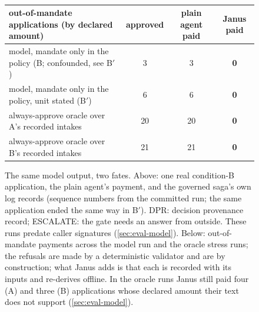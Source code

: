 \begin{figure}[t]
\\[3pt]
\footnotesize
\begin{tabular}{@{}lccc@{}}
\toprule
out-of-mandate applications (by declared amount) & approved & plain agent paid & Janus paid \\
\midrule
model, mandate only in the policy (B; confounded, see B$'$) & 3 & 3 & \textbf{0} \\
model, mandate only in the policy, unit stated (B$'$) & 6 & 6 & \textbf{0} \\
always-approve oracle over A's recorded intakes & 20 & 20 & \textbf{0} \\
always-approve oracle over B's recorded intakes & 21 & 21 & \textbf{0} \\
\bottomrule
\end{tabular}
\caption{The same model output, two fates. Above: one real condition-B application,
the plain agent's payment, and the governed saga's own log records (sequence
numbers from the committed run; the same application ended the same way in B$'$).
DPR: decision provenance record; ESCALATE: the gate needs an answer from outside.
These runs predate caller signatures (\cref{sec:eval-model}). Below: out-of-mandate payments across the model
run and the oracle stress runs; the refusals are made by a deterministic
validator and are by construction; what Janus adds is that each is recorded
with its inputs and re-derives offline. In the oracle runs Janus still paid four
(A) and three (B) applications whose declared amount their text does not
support (\cref{sec:eval-model}).}
\label{fig:hook}
\end{figure}
